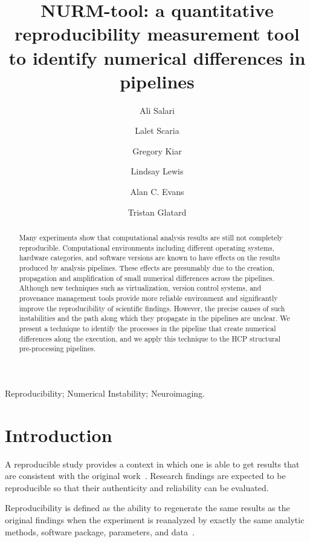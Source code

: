 \documentclass[a4paper,num-refs]{oup-contemporary}
\title{NURM-tool: a quantitative reproducibility measurement tool to 
identify numerical differences in pipelines}
\begin{document}
\author[1]{Ali Salari}
\author[1]{Lalet Scaria}
\author[2,3]{Gregory Kiar}
\author[2]{Lindsay Lewis}
\author[2,3]{Alan C. Evans}
\author[1]{Tristan Glatard}


\maketitle

\begin{abstract} 

Many experiments show that computational analysis results are still not 
completely reproducible. Computational environments including different 
operating systems, hardware categories, and software versions are known 
to have effects on the results produced by analysis pipelines. These 
effects are presumably due to the creation, propagation and 
amplification of small numerical differences across the pipelines. 
Although new techniques such as virtualization, version control 
systems, and provenance management tools provide more reliable 
environment and significantly improve the reproducibility of scientific 
findings. However, the precise causes of such instabilities and the 
path along which they propagate in the pipelines are unclear.  We 
present a technique to identify the processes in the pipeline that 
create numerical differences along the execution, and we apply this 
technique to the HCP structural pre-processing pipelines.

\end{abstract}

\begin{keywords}
Reproducibility; Numerical Instability; Neuroimaging.
\end{keywords}

\section{Introduction}

A reproducible study provides a context in which one is able to get 
results that are consistent with the original 
work~\cite{plesser2018reproducibility}. Research findings are expected 
to be reproducible so that their authenticity and reliability can be 
evaluated. 

Reproducibility is defined as the ability to regenerate the same 
results as the original findings when the experiment is reanalyzed by 
exactly the same analytic methods, software package, parameters, and 
data~\cite{peng2011reproducible}. 
\end{document}
